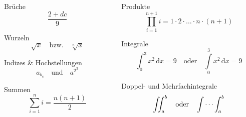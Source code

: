 \documentclass[9pt]{beamer}
\begin{document}
\begin{frame}
	\begin{columns}
		\begin{column}{0.49\textwidth}
			\begin{exampleblock}{Brüche}
				\begin{equation*}\frac{2+dc}{9}\end{equation*}
			\end{exampleblock}
			\begin{exampleblock}{Wurzeln}
				\begin{equation*}
					\sqrt{x}
					\quad\text{bzw.}\quad
					\sqrt[n]{x}
				\end{equation*}
			\end{exampleblock}
			\begin{exampleblock}{Indizes \& Hochstellungen}
				\begin{equation*}a_{b_c} \quad\text{und}\quad a^{2^3}\end{equation*}
			\end{exampleblock}
			\begin{exampleblock}{Summen}
				\begin{equation*}\sum\limits_{i=1}^n i = \frac{n(n+1)}{2}\end{equation*}
			\end{exampleblock}
		\end{column}
		\begin{column}{0.49\textwidth}
			\begin{exampleblock}{Produkte}
				\begin{equation*}\prod\limits_{i=1}^{n+1}i = 1\cdot 2\cdot\ldots\cdot n\cdot (n+1)\end{equation*}
			\end{exampleblock}
			\begin{exampleblock}{Integrale}
				\begin{equation*}
					\int_0^3 x^2\,\mathrm{d}x = 9
					\quad\text{oder}\quad
					\int\limits_0^3 x^2 \,\mathrm{d}x = 9
				\end{equation*}
			\end{exampleblock}
			\begin{exampleblock}{Doppel- und Mehrfachintegrale}
				\begin{equation*}
					\iint_a^b
					\quad\text{oder}\quad
					\idotsint_a^b
				\end{equation*}
			\end{exampleblock}
		\end{column}
	\end{columns}
\end{frame}
\end{document}
